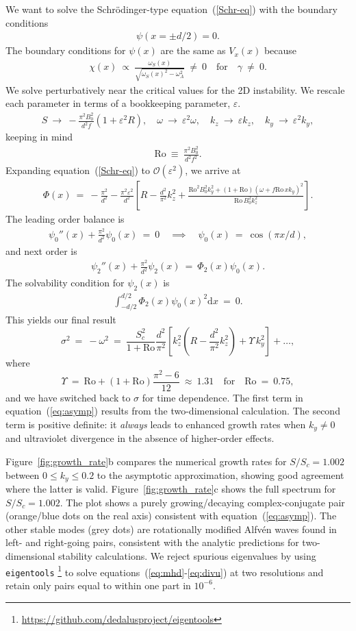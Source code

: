 \documentclass[openacc]{rsproca_new}%
\newcommand{\SSC}{S/S_{c}}
\newcommand\Beq{\begin{eqnarray}}
\newcommand\Eeq{\end{eqnarray}}
\newcommand{\Ro}{\mathrm{Ro}}
\newcommand{\eps}{\varepsilon}
\begin{document}
We want to solve the Schr\"{o}dinger-type equation~(\ref{Schr-eq}) with the boundary conditions 
\Beq
\psi(x=\pm d/2) = 0.
\Eeq
The boundary conditions for $\psi(x)$ are the same as $V_{x}(x)$ because 
\Beq
\chi(x) \ \propto \ \frac{\omega_{S}(x)}{\sqrt{\omega_{S}(x)^2-\omega _A^2}} \  \ne \ 0 \quad \text{for} \quad \gamma \ \ne \ 0.
\Eeq
We solve perturbatively near the critical values for the 2D instability. We rescale each parameter in terms of a bookkeeping parameter, $\eps$.
\Beq
S  \ \to \  - \frac{\pi ^2 B_{0}^2}{d^2 f} ( 1 + \eps^{2} R), \quad \omega \ \to \ \eps^{2} \omega , \quad k_{z} \ \to \ \eps k_{z}, \quad k_{y} \ \to \ \eps^{2} k_{y},
\Eeq 
keeping in mind
\Beq
\Ro  \ \equiv  \ \frac{\pi ^2 B_{0}^2}{d^2 f^{2}}.
\Eeq
Expanding equation~(\ref{Schr-eq}) to $\mathcal{O}(\eps^{2})$, we arrive at
\Beq
\Phi(x) \ = \ -\frac{\pi^{2}}{d^{2}} - \frac{\pi^{2} \eps^{2}}{d^{2}}\left[R - \frac{d^2 }{\pi^2}k_z^2 + \frac{\Ro^2 B_0^2  k_y^2+(1+\Ro) (\omega + f \Ro\, x k_y) ^2}{ \Ro\, B_0^2
   k_z^2} \right].
\Eeq
The leading order balance is
\Beq
\psi_{0}''(x) + \frac{\pi^{2}}{d^{2}}  \psi_{0}(x) \ = \ 0  \quad \implies \quad \psi_{0}(x) \ = \ \cos(\pi x / d),
\Eeq
and next order is
\Beq
\psi_{2}''(x) + \frac{\pi^{2}}{d^{2}}  \psi_{2}(x) \ = \  \Phi_{2}(x)\psi_{0}(x) .
\Eeq
The solvability condition for $\psi_{2}(x)$ is 
\Beq
\int_{-d/2}^{d/2} \Phi_{2}(x)\psi_{0}(x)^{2} \text{d} x \ = \ 0.
\Eeq
This yields our final result
\begin{equation}\label{eq:asymp}
\sigma^{2}\ = \ - \omega^{2} \ = \  \frac{S_{c}^{2}}{1+\Ro} \frac{d^{2}}{\pi^{2}} \left[ k_{z}^{2}\left(R-\frac{d^2}{\pi^{2}}k_{z}^{2}\right)+\Upsilon\,k_{y}^{2}\right]+\ldots,
\end{equation}
where
\begin{equation}
\Upsilon \ = \  \Ro + (1+ \Ro) \frac{\pi^{2}-6}{12}  \ \approx \ 1.31\quad\text{for}\quad{\Ro} \ = \ 0.75,
\end{equation}
and we have switched back to $\sigma$ for time dependence.
The first term in equation~(\ref{eq:asymp}) results from the two-dimensional calculation.
The second term is positive definite: it \emph{always} leads to enhanced growth rates when $k_{y}\neq0$ and ultraviolet divergence in the absence of higher-order effects.

Figure~\ref{fig:growth_rate}b compares the numerical growth rates for $\SSC=1.002$ between $0\le{k_{y}}\le0.2$ to the asymptotic approximation, showing good agreement where the latter is valid.
Figure~\ref{fig:growth_rate}c shows the full spectrum for $\SSC=1.002$.
The plot shows a purely growing/decaying complex-conjugate pair (orange/blue dots on the real axis) consistent with equation~(\ref{eq:asymp}).
The other stable modes (grey dots) are rotationally modified Alfv\'{e}n waves found in left- and right-going pairs, consistent with the analytic predictions for two-dimensional stability calculations.
We reject spurious eigenvalues by using \texttt{eigentools} \footnote{\protect\url{https://github.com/dedalusproject/eigentools}} to solve equations~(\ref{eq:mhd}-\ref{eq:divu}) at two resolutions and retain only pairs equal to within one part in $10^{-6}$.
\end{document}
